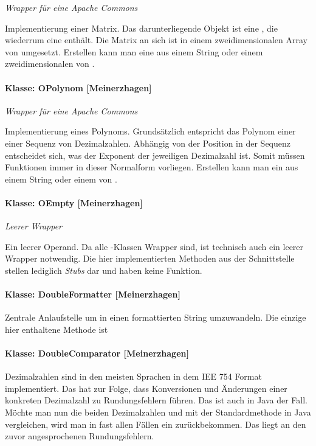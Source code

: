 \textit{Wrapper für eine Apache Commons} 

Implementierung einer Matrix. Das darunterliegende Objekt ist eine , die wiederrum eine  enthält. Die Matrix an sich ist in einem zweidimensionalen Array von  umgesetzt. Erstellen kann man eine  aus einem String oder einem zweidimensionalen  von .


\paragraph{Klasse: OPolynom [Meinerzhagen]}

\textit{Wrapper für eine Apache Commons} 

Implementierung eines Polynoms. Grundsätzlich entspricht das Polynom einer einer Sequenz von Dezimalzahlen. Abhängig von der Position in der Sequenz entscheidet sich, was der Exponent der jeweiligen Dezimalzahl ist. Somit müssen Funktionen immer in dieser Normalform vorliegen. Erstellen kann man ein  aus einem String oder einem  von .

\paragraph{Klasse: OEmpty [Meinerzhagen]}

\textit{Leerer Wrapper}

Ein leerer Operand. Da alle -Klassen Wrapper sind, ist technisch auch ein leerer Wrapper notwendig. Die hier implementierten Methoden aus der Schnittstelle stellen lediglich \textit{Stubs} dar und haben keine Funktion.

\paragraph{Klasse: DoubleFormatter [Meinerzhagen]}

Zentrale Anlaufstelle um  in einen formattierten String umzuwandeln. Die einzige hier enthaltene Methode ist 


\paragraph{Klasse: DoubleComparator [Meinerzhagen]}

Dezimalzahlen sind in den meisten Sprachen in dem IEE 754 Format implementiert. Das hat zur Folge, dass Konversionen und Änderungen einer konkreten Dezimalzahl zu Rundungsfehlern führen. Das ist auch in Java der Fall. Möchte man nun die beiden Dezimalzahlen  und  mit der Standardmethode in Java vergleichen, wird man in fast allen Fällen ein  zurückbekommen. Das liegt an den zuvor angesprochenen Rundungsfehlern. 

